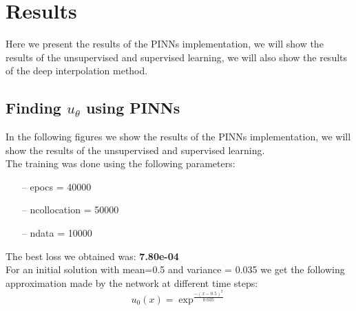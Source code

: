 \documentclass{article}
\begin{document}
\section{Results}

Here we present the results of the PINNs implementation, we will show the results of the unsupervised and supervised learning, we will also show the results of the deep interpolation method.

\subsection{Finding $u_\theta$ using PINNs}

In the following figures we show the results of the PINNs implementation, we will show the results of the unsupervised and supervised learning.\\

The training was done using the following parameters:

\begin{itemize}
   \item[--] epocs = 40000
   \item[--] ncollocation = 50000
   \item[--] ndata = 10000
\end{itemize} The best loss we obtained was: \textbf{7.80e-04} \\
For an initial solution with mean=0.5 and variance = 0.035 we get the following approximation made by the network at different time steps:\\

\begin{equation*}
    u_0(x) = \exp^{\frac{-(x-0.5)^2}{0.035}}
\end{equation*}
\end{document}

